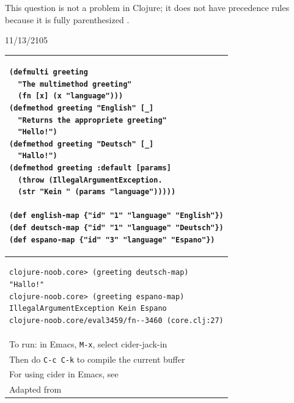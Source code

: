 \documentclass[12pt]{article}
\begin{document}

This question is not a problem in Clojure; it does not have precedence rules because it is fully parenthesized \cite{fogus2014joy}.


11/13/2105
\begin{tabular}{|p{}|}
\hline
\begin{verbatim}
(defmulti greeting
  "The multimethod greeting"
  (fn [x] (x "language")))
(defmethod greeting "English" [_]
  "Returns the appropriete greeting"
  "Hello!")
(defmethod greeting "Deutsch" [_]
  "Hallo!")
(defmethod greeting :default [params]
  (throw (IllegalArgumentException.
  (str "Kein " (params "language")))))
  
(def english-map {"id" "1" "language" "English"})
(def deutsch-map {"id" "1" "language" "Deutsch"})
(def espano-map {"id" "3" "language" "Espano"})
\end{verbatim}
\\
\hline
\begin{verbatim}
clojure-noob.core> (greeting deutsch-map)
"Hallo!"
clojure-noob.core> (greeting espano-map)
IllegalArgumentException Kein Espano 
clojure-noob.core/eval3459/fn--3460 (core.clj:27)
\end{verbatim}
\\
\hline
To run: in Emacs, \texttt{M-x}, select cider-jack-in\\
Then do \texttt{C-c C-k} to compile the current buffer\\
For using cider in Emacs, see \cite{brave2015}\\
\hline
Adapted from \cite{clojuredocmulti}\\
\hline
\end{tabular}



  

\end{document}
